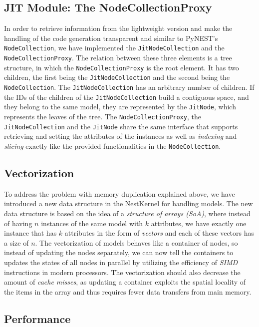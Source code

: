 \subsection*{JIT Module: The NodeCollectionProxy}

In order to retrieve information from the lightweight version and make the handling of the code generation transparent and similar to PyNEST's \texttt{NodeCollection}, we have implemented the \texttt{JitNodeCollection} and the \texttt{NodeCollectionProxy}. The relation between these three elements is a tree structure, in which the \texttt{NodeCollectionProxy} is the root element. It has two children, the first being the \texttt{JitNodeCollection} and the second being the \texttt{NodeCollection}. The \texttt{JitNodeCollection} has an arbitrary number of children. If the IDs of the children of the \texttt{JitNodeCollection} build a contiguous space, and they belong to the same model, they are represented by the \texttt{JitNode}, which represents the leaves of the tree. The \texttt{NodeCollectionProxy}, the \texttt{JitNodeCollection} and the \texttt{JitNode} share the same interface that supports retrieving and setting the attributes of the instances as well as \emph{indexing} and \emph{slicing} exactly like the provided functionalities in the \texttt{NodeCollection}.

\subsection*{Vectorization}

To address the problem with memory duplication explained above, we have introduced a new data structure in the NestKernel for handling models. The new data structure is based on the idea of a \emph{structure of arrays (SoA)}, where instead of having $n$ instances of the same model with $k$ attributes, we have exactly one instance that has $k$ attributes in the form of \emph{vectors} and each of these vectors has a size of $n$. The vectorization of models behaves like a container of nodes, so instead of updating the nodes separately, we can now tell the containers to updates the states of all nodes in parallel by utilizing the efficiency of \emph{SIMD} instructions in modern processors. The vectorization should also decrease the amount of \emph{cache misses}, as updating a container exploits the spatial locality of the items in the array and thus requires fewer data transfers from main memory.

\subsection*{Performance}

